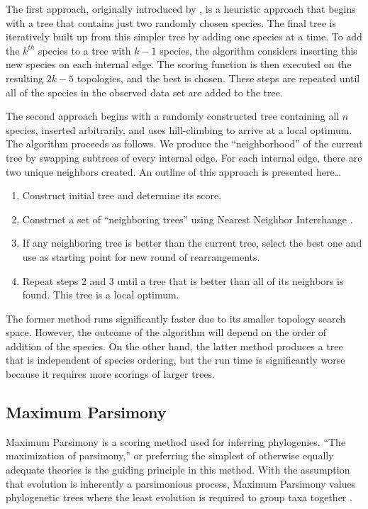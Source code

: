 \documentclass[10pt,twocolumn]{article}
\begin{document}
The first approach, originally introduced by \cite{felsenstein1981evolutionary}, is a heuristic approach that begins with a tree that contains just two randomly chosen species. The final tree is iteratively built up from this simpler tree by adding one species at a time. To add the $k^{th}$ species to a tree with $k-1$ species, the algorithm considers inserting this new species on each internal edge. The scoring function is then executed on the resulting $2k-5$ topologies, and the best is chosen. These steps are repeated until all of the species in the observed data set are added to the tree.

The second approach begins with a randomly constructed tree containing all $n$ species, inserted
arbitrarily, and uses hill-climbing to arrive at a local optimum. The algorithm proceeds as
follows. We produce the ``neighborhood'' of the current
tree by swapping subtrees of every internal edge. For each internal edge, there are two unique
neighbors created. An outline of this approach is presented here\ldots

\begin{enumerate}
\item Construct initial tree and determine its score.
\item Construct a set of ``neighboring trees'' using Nearest Neighbor Interchange \cite{waterman1978similarity}.
\item If any neighboring tree is better than the current tree, select the best one and use as starting point for new round of rearrangements.
\item Repeat steps 2 and 3 until a tree that is better than all of its neighbors is found. This tree is a local optimum.
\end{enumerate}

The former method runs significantly faster due to its smaller topology search space. However, the outcome of the algorithm will depend on the order of addition of the species. On the other hand, the latter method produces a tree that is independent of species ordering, but the run time is significantly worse because it requires more scorings of larger trees.

\subsection*{Maximum Parsimony}
Maximum Parsimony is a scoring method used for inferring phylogenies. ``The maximization of parsimony,'' or preferring the simplest of otherwise equally adequate theories is the guiding principle in this method. With the assumption that evolution is inherently a parsimonious process, Maximum Parsimony values phylogenetic trees where the least evolution is required to group taxa together \cite{fitch1971toward}.
\end{document}
